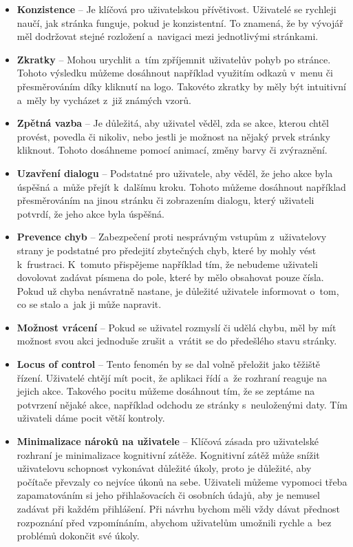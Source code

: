 \begin{itemize}
  \item \textbf{Konzistence} -- Je klíčová pro uživatelskou přívětivost. Uživatelé se rychleji naučí, jak stránka funguje, pokud je konzistentní. To znamená, že by vývojář měl dodržovat stejné rozložení a~navigaci mezi jednotlivými stránkami.
  \item \textbf{Zkratky} -- Mohou urychlit a~tím zpříjemnit uživatelův pohyb po stránce. Tohoto výsledku můžeme dosáhnout například využitím odkazů v~menu či přesměrováním díky kliknutí na logo. Takovéto zkratky by měly být intuitivní a~měly by vycházet z~již známých vzorů.
  \item \textbf{Zpětná vazba} -- Je důležitá, aby uživatel věděl, zda se akce, kterou chtěl provést, povedla či nikoliv, nebo jestli je možnost na nějaký prvek stránky kliknout. Tohoto dosáhneme pomocí animací, změny barvy či zvýraznění.
  \item \textbf{Uzavření dialogu} -- Podstatné pro uživatele, aby věděl, že jeho akce byla úspěšná a~může přejít k~dalšímu kroku. Tohoto můžeme dosáhnout například přesměrováním na jinou stránku či zobrazením dialogu, který uživateli potvrdí, že jeho akce byla úspěšná.
  \item \textbf{Prevence chyb} -- Zabezpečení proti nesprávným vstupům z~uživatelovy strany je podstatné pro předejití zbytečných chyb, které by mohly vést k~frustraci. K~tomuto přispějeme například tím, že nebudeme uživateli dovolovat zadávat písmena do pole, které by mělo obsahovat pouze čísla. Pokud už chyba nenávratně nastane, je důležité uživatele informovat o~tom, co se stalo a~jak ji může napravit.
  \item \textbf{Možnost vrácení} -- Pokud se uživatel rozmyslí či udělá chybu, měl by mít možnost svou akci jednoduše zrušit a~vrátit se do předešlého stavu stránky.
  \item \textbf{Locus of control} -- Tento fenomén by se dal volně přeložit jako těžiště řízení. Uživatelé chtějí mít pocit, že aplikaci řídí a~že rozhraní reaguje na jejich akce. Takového pocitu můžeme dosáhnout tím, že se zeptáme na potvrzení nějaké akce, například odchodu ze stránky s~neuloženými daty. Tím uživateli dáme pocit větší kontroly.
  \item \textbf{Minimalizace nároků na uživatele} -- Klíčová zásada pro uživatelské rozhraní je minimalizace kognitivní zátěže. Kognitivní zátěž může snížit uživatelovu schopnost vykonávat důležité úkoly, proto je důležité, aby počítače převzaly co nejvíce úkonů na sebe. Uživateli můžeme vypomoci třeba zapamatováním si jeho přihlašovacích či osobních údajů, aby je nemusel zadávat při každém přihlášení. Při návrhu bychom měli vždy dávat přednost rozpoznání před vzpomínáním, abychom uživatelům umožnili rychle a~bez problémů dokončit své úkoly.

\end{itemize}
